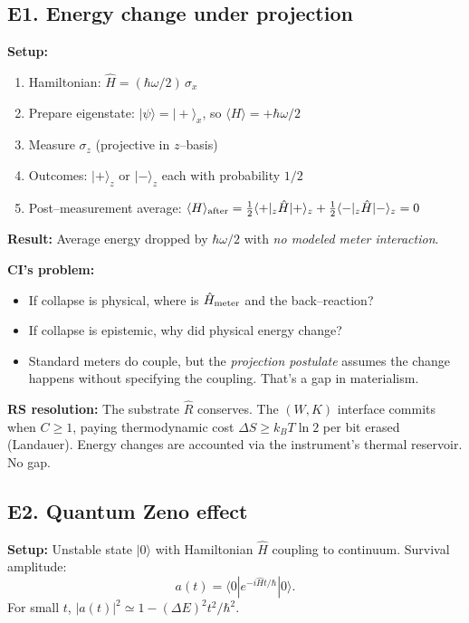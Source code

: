 \documentclass[11pt]{article}
\begin{document}
\subsection{E1. Energy change under projection}

\textbf{Setup:}
\begin{enumerate}[nosep]
  \item Hamiltonian: $\hat H = (\hbar\omega/2)\,\sigma_x$
  \item Prepare eigenstate: $|\psi\rangle = |+\rangle_x$, so $\langle H\rangle = +\hbar\omega/2$
  \item Measure $\sigma_z$ (projective in $z$--basis)
  \item Outcomes: $|+\rangle_z$ or $|-\rangle_z$ each with probability $1/2$
  \item Post--measurement average: $\langle H\rangle_{\rm after} = \tfrac12\langle+|_z\hat H|+\rangle_z + \tfrac12\langle-|_z\hat H|-\rangle_z = 0$
\end{enumerate}

\textbf{Result:} Average energy dropped by $\hbar\omega/2$ with \emph{no modeled meter interaction}.

\textbf{CI's problem:}
\begin{itemize}[nosep]
  \item If collapse is physical, where is $\hat H_{\rm meter}$ and the back--reaction?
  \item If collapse is epistemic, why did physical energy change?
  \item Standard meters do couple, but the \emph{projection postulate} assumes the change happens without specifying the coupling. That's a gap in materialism.
\end{itemize}

\textbf{RS resolution:}
The substrate $\hat R$ conserves. The $(W,K)$ interface commits when $C\ge 1$, paying thermodynamic cost $\Delta S \ge k_B T\ln 2$ per bit erased (Landauer). Energy changes are accounted via the instrument's thermal reservoir. No gap.

\subsection{E2. Quantum Zeno effect}

\textbf{Setup:}
Unstable state $|0\rangle$ with Hamiltonian $\hat H$ coupling to continuum. Survival amplitude:
\begin{equation}
  a(t) = \langle 0|e^{-i\hat H t/\hbar}|0\rangle.
\end{equation}
For small $t$, $|a(t)|^2 \simeq 1 - (\Delta E)^2 t^2/\hbar^2$.
\end{document}

